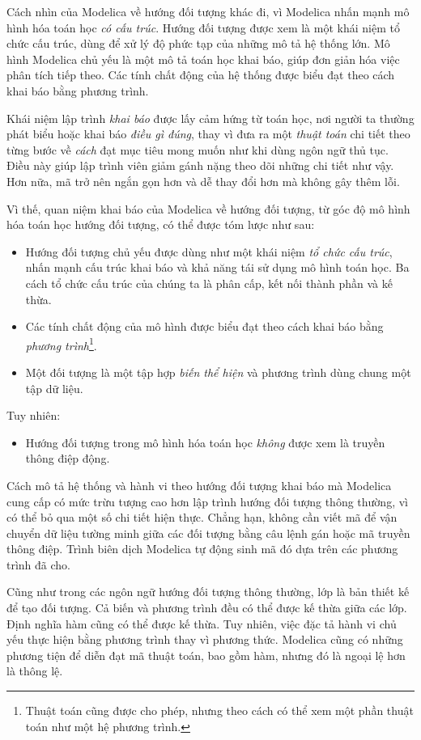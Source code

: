Cách nhìn của Modelica về hướng đối tượng khác đi, vì Modelica nhấn mạnh mô hình hóa toán học \emph{có cấu trúc}. Hướng đối tượng được xem là một khái niệm tổ chức cấu trúc, dùng để xử lý độ phức tạp của những mô tả hệ thống lớn. Mô hình Modelica chủ yếu là một mô tả toán học khai báo, giúp đơn giản hóa việc phân tích tiếp theo. Các tính chất động của hệ thống được biểu đạt theo cách khai báo bằng phương trình.

Khái niệm lập trình \emph{khai báo} được lấy cảm hứng từ toán học, nơi người ta thường phát biểu hoặc khai báo \emph{điều gì đúng}, thay vì đưa ra một \emph{thuật toán} chi tiết theo từng bước về \emph{cách} đạt mục tiêu mong muốn như khi dùng ngôn ngữ thủ tục. Điều này giúp lập trình viên giảm gánh nặng theo dõi những chi tiết như vậy. Hơn nữa, mã trở nên ngắn gọn hơn và dễ thay đổi hơn mà không gây thêm lỗi.

Vì thế, quan niệm khai báo của Modelica về hướng đối tượng, từ góc độ mô hình hóa toán học hướng đối tượng, có thể được tóm lược như sau:
\begin{itemize}
\item Hướng đối tượng chủ yếu được dùng như một khái niệm \emph{tổ chức cấu trúc}, nhấn mạnh cấu trúc khai báo và khả năng tái sử dụng mô hình toán học. Ba cách tổ chức cấu trúc của chúng ta là phân cấp, kết nối thành phần và kế thừa.
\item Các tính chất động của mô hình được biểu đạt theo cách khai báo bằng \emph{phương trình}\footnote{Thuật toán cũng được cho phép, nhưng theo cách có thể xem một phần thuật toán như một hệ phương trình.}.
\item Một đối tượng là một tập hợp \emph{biến thể hiện} và phương trình dùng chung một tập dữ liệu.
\end{itemize}
Tuy nhiên:
\begin{itemize}
\item Hướng đối tượng trong mô hình hóa toán học \emph{không} được xem là truyền thông điệp động.
\end{itemize}

Cách mô tả hệ thống và hành vi theo hướng đối tượng khai báo mà Modelica cung cấp có mức trừu tượng cao hơn lập trình hướng đối tượng thông thường, vì có thể bỏ qua một số chi tiết hiện thực. Chẳng hạn, không cần viết mã để vận chuyển dữ liệu tường minh giữa các đối tượng bằng câu lệnh gán hoặc mã truyền thông điệp. Trình biên dịch Modelica tự động sinh mã đó dựa trên các phương trình đã cho.

Cũng như trong các ngôn ngữ hướng đối tượng thông thường, lớp là bản thiết kế để tạo đối tượng. Cả biến và phương trình đều có thể được kế thừa giữa các lớp. Định nghĩa hàm cũng có thể được kế thừa. Tuy nhiên, việc đặc tả hành vi chủ yếu thực hiện bằng phương trình thay vì phương thức. Modelica cũng có những phương tiện để diễn đạt mã thuật toán, bao gồm hàm, nhưng đó là ngoại lệ hơn là thông lệ.

